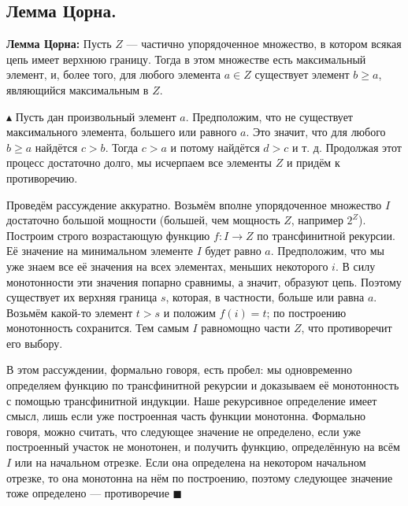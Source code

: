 \subsection{Лемма Цорна.}
\par \textbf{Лемма Цорна:} Пусть $Z$ — частично упорядоченное множество, в котором всякая цепь имеет верхнюю границу. Тогда в этом множестве есть максимальный элемент, и, более того, для любого элемента $a \in Z$ существует элемент $b \geq a$, являющийся максимальным в $Z$.
\par $\blacktriangle$ Пусть дан произвольный элемент $a$. Предположим, что не существует максимального элемента, большего или равного $a$. Это значит, что для любого $b \geq a$ найдётся $c > b$. Тогда $c > a$ и потому найдётся $d > c$ и т. д. Продолжая этот процесс достаточно долго, мы исчерпаем все элементы $Z$ и придём к противоречию.
\par Проведём рассуждение аккуратно. Возьмём вполне упорядоченное множество $I$ достаточно большой мощности (большей, чем
мощность $Z$, например $2^Z$). Построим строго возрастающую функцию $f : I \rightarrow Z$
по трансфинитной рекурсии. Её значение на минимальном элементе $I$ будет равно $a$. Предположим, что мы уже знаем все её значения на всех элементах, меньших некоторого $i$. В силу монотонности эти
значения попарно сравнимы, а значит, образуют цепь. Поэтому существует их верхняя граница $s$, которая, в частности, больше или равна $a$. Возьмём какой-то элемент $t > s$ и положим $f(i) = t$; по построению монотонность сохранится. Тем самым $I$ равномощно части $Z$, что противоречит его выбору.
\par В этом рассуждении, формально говоря, есть пробел: мы одновременно определяем функцию по трансфинитной рекурсии и доказываем её монотонность с помощью трансфинитной индукции. Наше рекурсивное определение имеет смысл, лишь если уже построенная
часть функции монотонна. Формально говоря, можно считать, что следующее значение не определено, если уже построенный участок не монотонен, и получить функцию, определённую на всём $I$ или на начальном отрезке. Если она определена
на некотором начальном отрезке, то она монотонна на нём по построению, поэтому следующее значение тоже определено — противоречие $\blacksquare$